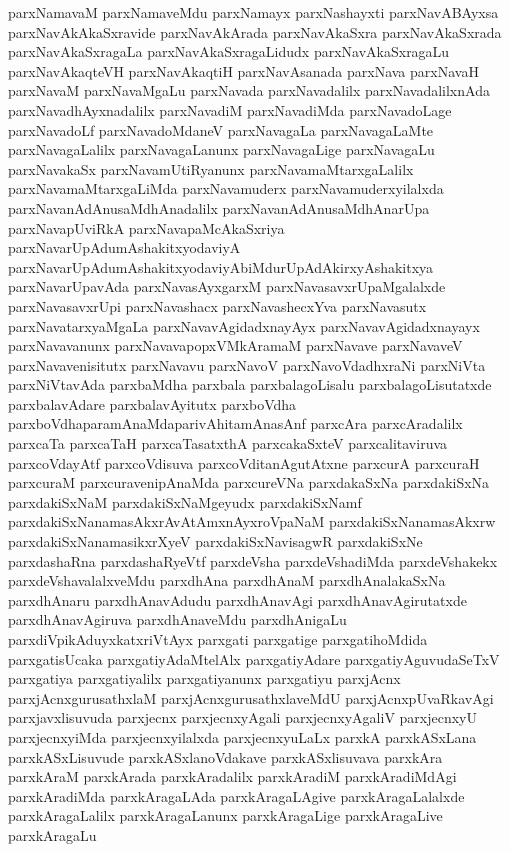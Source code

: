 {parxNamavaM
parxNamaveMdu
parxNamayx
parxNashayxti
parxNavABAyxsa
parxNavAkAkaSxravide
parxNavAkArada
parxNavAkaSxra
parxNavAkaSxrada
parxNavAkaSxragaLa
parxNavAkaSxragaLidudx
parxNavAkaSxragaLu
parxNavAkaqteVH
parxNavAkaqtiH
parxNavAsanada
parxNava
parxNavaH
parxNavaM
parxNavaMgaLu
parxNavada
parxNavadalilx
parxNavadalilxnAda
parxNavadhAyxnadalilx
parxNavadiM
parxNavadiMda
parxNavadoLage
parxNavadoLf
parxNavadoMdaneV
parxNavagaLa
parxNavagaLaMte
parxNavagaLalilx
parxNavagaLanunx
parxNavagaLige
parxNavagaLu
parxNavakaSx
parxNavamUtiRyanunx
parxNavamaMtarxgaLalilx
parxNavamaMtarxgaLiMda
parxNavamuderx
parxNavamuderxyilalxda
parxNavanAdAnusaMdhAnadalilx
parxNavanAdAnusaMdhAnarUpa
parxNavapUviRkA
parxNavapaMcAkaSxriya
parxNavarUpAdumAshakitxyodaviyA
parxNavarUpAdumAshakitxyodaviyAbiMdurUpAdAkirxyAshakitxya
parxNavarUpavAda
parxNavasAyxgarxM
parxNavasavxrUpaMgalalxde
parxNavasavxrUpi
parxNavashacx
parxNavashecxYva
parxNavasutx
parxNavatarxyaMgaLa
parxNavavAgidadxnayAyx
parxNavavAgidadxnayayx
parxNavavanunx
parxNavavapopxVMkAramaM
parxNavave
parxNavaveV
parxNavavenisitutx
parxNavavu
parxNavoV
parxNavoVdadhxraNi
parxNiVta
parxNiVtavAda
parxbaMdha
parxbala
parxbalagoLisalu
parxbalagoLisutatxde
parxbalavAdare
parxbalavAyitutx
parxboVdha
parxboVdhaparamAnaMdaparivAhitamAnasAnf
parxcAra
parxcAradalilx
parxcaTa
parxcaTaH
parxcaTasatxthA
parxcakaSxteV
parxcalitaviruva
parxcoVdayAtf
parxcoVdisuva
parxcoVditanAgutAtxne
parxcurA
parxcuraH
parxcuraM
parxcuravenipAnaMda
parxcureVNa
parxdakaSxNa
parxdakiSxNa
parxdakiSxNaM
parxdakiSxNaMgeyudx
parxdakiSxNamf
parxdakiSxNanamasAkxrAvAtAmxnAyxroVpaNaM
parxdakiSxNanamasAkxrw
parxdakiSxNanamasikxrXyeV
parxdakiSxNavisagwR
parxdakiSxNe
parxdashaRna
parxdashaRyeVtf
parxdeVsha
parxdeVshadiMda
parxdeVshakekx
parxdeVshavalalxveMdu
parxdhAna
parxdhAnaM
parxdhAnalakaSxNa
parxdhAnaru
parxdhAnavAdudu
parxdhAnavAgi
parxdhAnavAgirutatxde
parxdhAnavAgiruva
parxdhAnaveMdu
parxdhAnigaLu
parxdiVpikAduyxkatxriVtAyx
parxgati
parxgatige
parxgatihoMdida
parxgatisUcaka
parxgatiyAdaMtelAlx
parxgatiyAdare
parxgatiyAguvudaSeTxV
parxgatiya
parxgatiyalilx
parxgatiyanunx
parxgatiyu
parxjAcnx
parxjAcnxgurusathxlaM
parxjAcnxgurusathxlaveMdU
parxjAcnxpUvaRkavAgi
parxjavxlisuvuda
parxjecnx
parxjecnxyAgali
parxjecnxyAgaliV
parxjecnxyU
parxjecnxyiMda
parxjecnxyilalxda
parxjecnxyuLaLx
parxkA
parxkASxLana
parxkASxLisuvude
parxkASxlanoVdakave
parxkASxlisuvava
parxkAra
parxkAraM
parxkArada
parxkAradalilx
parxkAradiM
parxkAradiMdAgi
parxkAradiMda
parxkAragaLAda
parxkAragaLAgive
parxkAragaLalalxde
parxkAragaLalilx
parxkAragaLanunx
parxkAragaLige
parxkAragaLive
parxkAragaLu
}

